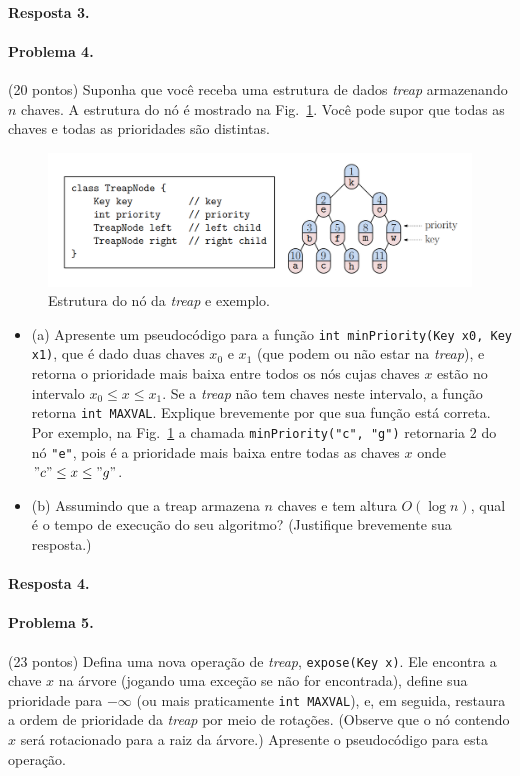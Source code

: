 \documentclass{article}
\begin{document}
\paragraph{Resposta 3.}

\paragraph{Problema 4.} (20 pontos)
Suponha que você receba uma estrutura de dados \textit{treap} armazenando $n$ chaves. A estrutura do nó
é mostrado na Fig.~\ref{fig:prob4}. Você pode supor que todas as chaves e todas as prioridades são distintas.

\begin{figure}[h]
    \centering
    \includegraphics[width = 0.8\linewidth]{figs/fig2.png}
    \caption{Estrutura do nó da \textit{treap} e exemplo.}
    \label{fig:prob4}
\end{figure}

\begin{itemize}
    \item (a) Apresente um pseudocódigo para a função \texttt{int minPriority(Key x0, Key x1)}, que é dado duas chaves $x_0$ e $x_1$ (que podem ou não estar na \textit{treap}), e retorna o
prioridade mais baixa entre todos os nós cujas chaves $x$ estão no intervalo $x_0 \leq x \leq x_1$. Se a \textit{treap}
não tem chaves neste intervalo, a função retorna \texttt{int MAXVAL}. Explique brevemente por que
sua função está correta. Por exemplo, na Fig.~\ref{fig:prob4} a chamada \texttt{minPriority("c", "g")} retornaria $2$ do nó
\texttt{"e"}, pois é a prioridade mais baixa entre todas as chaves $x$ onde $"c" \leq x \leq "g"$.
\item (b) Assumindo que a treap armazena $n$ chaves e tem altura $O(\log n)$, qual é o tempo de execução
do seu algoritmo? (Justifique brevemente sua resposta.)
\end{itemize}

\paragraph{Resposta 4.}

\paragraph{Problema 5.} (23 pontos)
Defina uma nova operação de \textit{treap}, \texttt{expose(Key x)}. Ele encontra a chave $x$ na árvore (jogando
uma exceção se não for encontrada), define sua prioridade para $-\infty$ (ou mais praticamente \texttt{int MAXVAL}),
e, em seguida, restaura a ordem de prioridade da \textit{treap} por meio de rotações. (Observe que o nó contendo $x$ será rotacionado para a raiz da árvore.) Apresente o pseudocódigo para esta operação.
\end{document}
